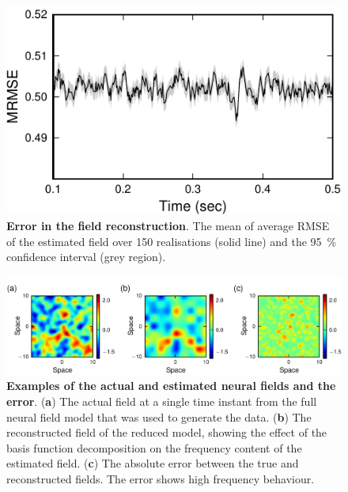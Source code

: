\documentclass[12pt]{iopart}
\begin{document}
\begin{figure}[!ht]
\begin{center}
\includegraphics{./Graph/pdf/Figure9.pdf} 
\end{center}
\caption{{\bf Error in the field reconstruction}. The mean of average RMSE of the estimated field over 150 realisations (solid line) and the 95~\% confidence interval (grey region).} 
\label{fig:Figure9}
\end{figure}

\begin{figure}[!ht]
\begin{center}
\includegraphics{./Graph/pdf/Figure10.pdf}
\end{center}
\caption{{\bf Examples of the actual and estimated neural fields and the error}. (\textbf{a}) The actual field at a single time instant from the full neural field model that was used to generate the data. (\textbf{b}) The reconstructed field of the reduced model, showing the effect of the basis function decomposition on the frequency content of the estimated field. (\textbf{c}) The absolute error between the true and reconstructed fields. The error shows high frequency behaviour.}
\label{fig:Figure10}
\end{figure}
\end{document}
